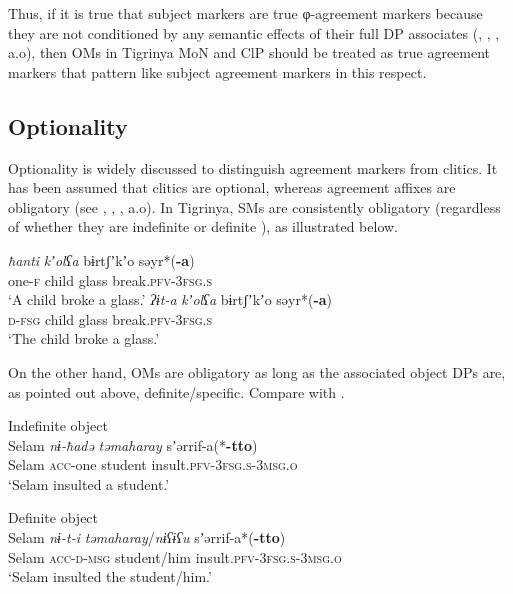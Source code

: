 \documentclass[output=paper]{langscibook}
\begin{document}
Thus, if it is true that subject markers are true φ-agreement markers because they are not conditioned by any semantic effects of their full DP associates (\citealt{preminger09}, \citealt{nevins11a}, \citealt{kramer14}, a.o), then OMs in Tigrinya MoN and ClP should be treated as true agreement markers that pattern like subject agreement markers in this respect.

\subsection{Optionality}
Optionality is widely discussed to distinguish agreement markers from clitics. It has been assumed that clitics are optional, whereas agreement affixes are obligatory (see \citealt{corbett2006}, \citealt{nevins11a}, \citealt{baker12}, a.o).
In Tigrinya, SMs are consistently obligatory (regardless of whether they are indefinite  or definite ), as illustrated below. 
\begin{multicols}{2}
\ea
\ea\label{ex:Gebregziabher:indef1} 
\gll \textit{ħanti} \textit{kʼolʕa} bɨrtʃʼkʼo səyr*({\textbf{-a}}) \\
one-{\scshape f} child glass break.{\scshape pfv-3fsg.s}\\
\glt `A child broke a glass.'
\ex\label{ex:Gebregziabher:defsubj} 
\gll \textit{ʔɨt-a} \textit{kʼolʕa} bɨrtʃʼkʼo səyr*({\textbf{-a}}) \\
{\scshape d-fsg} child glass break.{\scshape pfv-3fsg.s}\\
\glt `The child broke a glass.'
\z
\z
\end{multicols}
\noindent On the other hand, OMs are obligatory as long as the associated object DPs are, as pointed out above, definite/specific. Compare  with . 


\ea\label{ex:Gebregziabher:indef2} 
\ea\label{ex:Gebregziabher:indefobj} Indefinite object \\
\gll Selam \textit{nɨ-ħadə} \textit{təmaharay} sʼərrif-a(*{\textbf{-tto}}) \\
Selam {\scshape acc-}one student insult.{\scshape pfv-3fsg.s-3msg.o}\\
\glt `Selam insulted a student.'

\ex\label{ex:Gebregziabher:defobj} Definite object \\
\gll Selam \textit{nɨ-t-i} \textit{təmaharay}/\textit{nɨʕɨʕu} sʼərrif-a*({\textbf{-tto}}) \\
Selam {\scshape acc-d-msg} student/him insult.{\scshape pfv-3fsg.s-3msg.o}\\
\glt `Selam insulted the student/him.'
\z
\z
\end{document}
